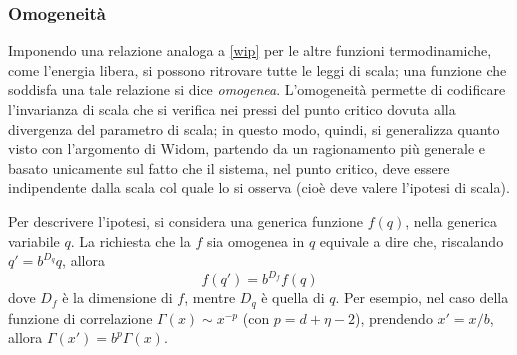 \documentclass[11pt, a4paper]{scrartcl}
\theoremstyle{style}
\theoremstyle{style1}
\numberwithin{equation}{subsection}
\begin{document}
\subsubsection{Omogeneit\`a}
Imponendo una relazione analoga a \ref{wip} per le altre funzioni termodinamiche, come l'energia libera, si possono ritrovare tutte le leggi di scala; una funzione che soddisfa una tale relazione si dice \textit{omogenea}.
L'omogeneit\`a permette di codificare l'invarianza di scala che si verifica nei pressi del punto critico dovuta alla divergenza del parametro di scala; in questo modo, quindi, si generalizza quanto visto con l'argomento di Widom, partendo da un ragionamento pi\`u generale e basato unicamente sul fatto che il sistema, nel punto critico, deve essere indipendente dalla scala col quale lo si osserva (cio\`e deve valere l'ipotesi di scala).

Per descrivere l'ipotesi, si considera una generica funzione $f(q)$, nella generica variabile $q$.
La richiesta che la $f$ sia omogenea in $q$ equivale a dire che, riscalando $q' = b^{D_q}q$, allora 
\[
f(q') = b^{D_f}f(q)
\] 
dove $D_f$ \`e la dimensione di $f$, mentre $D_q$ \`e quella di $q$. 
Per esempio, nel caso della funzione di correlazione $\Gamma(x) \sim x^{-p}$ (con $ p = d+ \eta - 2$), prendendo $x' = x / b$, allora $\Gamma(x') = b^p \Gamma(x)$.
 
\end{document}
